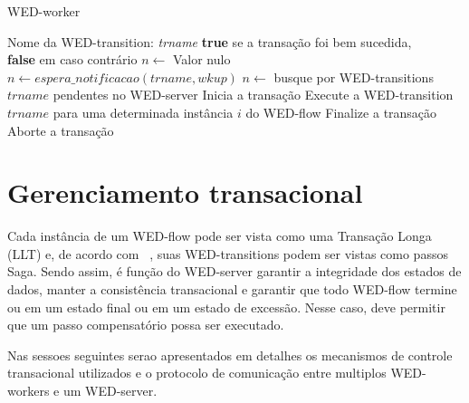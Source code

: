 \documentclass[conference]{IEEEtran}
\begin{document}
\begin{algorithm}
\caption{WED-worker}
\label{alg1}
\begin{algorithmic}[1]
\REQUIRE Nome da WED-transition: \emph{trname}
\ENSURE \textbf{true} se a transação foi bem sucedida,\\
         \hspace{23pt}\textbf{false} em caso contrário
\LOOP
\STATE $n \leftarrow$ Valor nulo
\STATE $n \leftarrow espera\_notificacao(trname,wkup)$
\STATE $n \leftarrow $ busque por WED-transitions $trname$ pendentes no WED-server
\ENDIF
\ENDWHILE
\STATE Inicia a transação 
\STATE Execute a WED-transition $trname$ para uma determinada instância $i$ do WED-flow
\STATE Finalize a transação
\RETURN \TRUE
\ELSE
\STATE Aborte a transação
\RETURN \FALSE
\ENDIF  
\ENDLOOP

\end{algorithmic}
\end{algorithm}

\section{Gerenciamento transacional}
Cada instância de um WED-flow pode ser vista como uma Transação Longa (LLT) e, de acordo com ~\cite{SGD87},
suas WED-transitions podem ser vistas como passos Saga. Sendo assim, é função do WED-server garantir a integridade dos estados
de dados, manter a consistência transacional e garantir que todo WED-flow termine ou em um estado final ou em um estado
de excessão. Nesse caso, deve permitir que um passo compensatório possa ser executado. 
\par
Nas sessoes seguintes serao apresentados em detalhes os mecanismos de controle transacional utilizados e o protocolo de
comunicação entre multiplos WED-workers e um WED-server.

\end{document}
